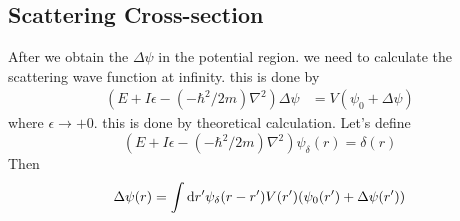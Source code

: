 \documentclass[12pt,twoside]{article}
\def\df{{\rm d}}
\begin{document}
\subsection{Scattering Cross-section}

After we obtain the $\Delta \psi$ in the potential region. we need to calculate the scattering wave function at infinity. this is done by
\begin{align}
(E + I\epsilon -(-\hbar^2/2m)\nabla^2)\Delta\psi &= V(\psi_0 + \Delta \psi)
\end{align}
where $\epsilon\rightarrow +0$. this is done by theoretical calculation.
Let's define
$$
(E + I\epsilon -(-\hbar^2/2m)\nabla^2)\psi_\delta(r) = \delta(r)
$$
Then
$$
\Delta\psi(r) = \int \df r^\prime \psi_\delta(r-r^\prime) V(r^\prime)(\psi_0(r^\prime) + \Delta\psi(r^\prime))
$$
\end{document}
